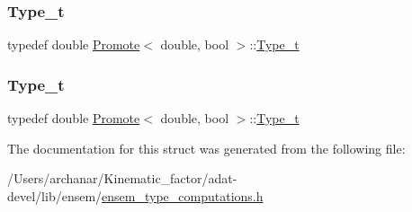 \subsubsection{\texorpdfstring{Type\_t}{Type\_t}\hspace{0.1cm}{\footnotesize\ttfamily [2/3]}}
{\footnotesize\ttfamily typedef double \mbox{\hyperlink{structPromote}{Promote}}$<$ double, bool $>$\+::\mbox{\hyperlink{structPromote_3_01double_00_01bool_01_4_a0daa22cf2a9d3b7070f5d6945d770c68}{Type\+\_\+t}}}

\mbox{\label{structPromote_3_01double_00_01bool_01_4_a0daa22cf2a9d3b7070f5d6945d770c68}} 
\subsubsection{\texorpdfstring{Type\_t}{Type\_t}\hspace{0.1cm}{\footnotesize\ttfamily [3/3]}}
{\footnotesize\ttfamily typedef double \mbox{\hyperlink{structPromote}{Promote}}$<$ double, bool $>$\+::\mbox{\hyperlink{structPromote_3_01double_00_01bool_01_4_a0daa22cf2a9d3b7070f5d6945d770c68}{Type\+\_\+t}}}



The documentation for this struct was generated from the following file\+:\begin{DoxyCompactItemize}
\item 
/\+Users/archanar/\+Kinematic\+\_\+factor/adat-\/devel/lib/ensem/\mbox{\hyperlink{adat-devel_2lib_2ensem_2ensem__type__computations_8h}{ensem\+\_\+type\+\_\+computations.\+h}}\end{DoxyCompactItemize}
